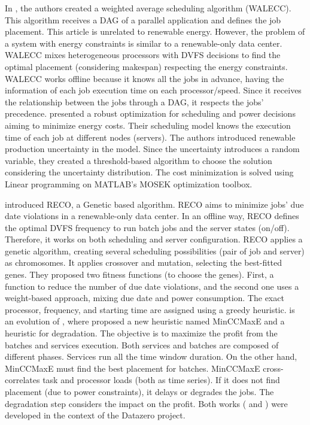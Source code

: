 In \cite{hu2018schedule}, the authors created a weighted average scheduling algorithm (WALECC). This algorithm receives a DAG of a parallel application and defines the job placement. This article is unrelated to renewable energy. However, the problem of a system with energy constraints is similar to a renewable-only data center. WALECC mixes heterogeneous processors with DVFS decisions to find the optimal placement (considering makespan) respecting the energy constraints. WALECC works offline because it knows all the jobs in advance, having the information of each job execution time on each processor/speed. Since it receives the relationship between the jobs through a DAG, it respects the jobs' precedence. \citeauthor{lu2018energy} \cite{lu2018energy} presented a robust optimization for scheduling and power decisions aiming to minimize energy costs. Their scheduling model knows the execution time of each job at different nodes (servers). The authors introduced renewable production uncertainty in the model. Since the uncertainty introduces a random variable, they created a threshold-based algorithm to choose the solution considering the uncertainty distribution. The cost minimization is solved using Linear programming on MATLAB's MOSEK optimization toolbox.

\citeauthor{caux2018optimization} \cite{caux2018optimization} introduced RECO, a Genetic based algorithm. RECO aims to minimize jobs' due date violations in a renewable-only data center. In an offline way, RECO defines the optimal DVFS frequency to run batch jobs and the server states (on/off). Therefore, it works on both scheduling and server configuration. RECO applies a genetic algorithm, creating several scheduling possibilities (pair of job and server) as chromosomes. It applies crossover and mutation, selecting the best-fitted genes. They proposed two fitness functions (to choose the genes). First, a function to reduce the number of due date violations, and the second one uses a weight-based approach, mixing due date and power consumption. The exact processor, frequency, and starting time are assigned using a greedy heuristic. \cite{caux2019phase} is an evolution of \cite{caux2018optimization}, where \citeauthor{caux2019phase}  proposed a new heuristic named MinCCMaxE and a heuristic for degradation. The objective is to maximize the profit from the batches and services execution. Both services and batches are composed of different phases. Services run all the time window duration. On the other hand, MinCCMaxE must find the best placement for batches. MinCCMaxE cross-correlates task and processor loads (both as time series). If it does not find placement (due to power constraints), it delays or degrades the jobs. The degradation step considers the impact on the profit. Both works (\cite{caux2018optimization} and \cite{caux2019phase}) were developed in the context of the Datazero project.

